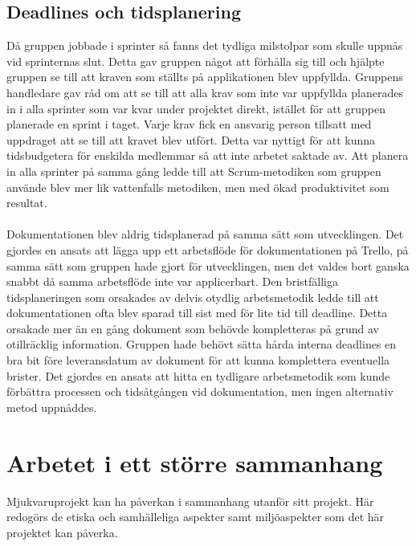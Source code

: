 \subsection{Deadlines och tidsplanering}
Då gruppen jobbade i sprinter så fanns det tydliga milstolpar som skulle uppnås vid sprinternas slut. Detta gav gruppen något att förhålla sig till och hjälpte gruppen se till att kraven som ställts på applikationen blev uppfyllda. Gruppens handledare gav råd om att se till att alla krav som inte var uppfyllda planerades in i alla sprinter som var kvar under projektet direkt, istället för att gruppen planerade en sprint i taget. Varje krav fick en ansvarig person tillsatt med uppdraget att se till att kravet blev utfört. Detta var nyttigt för att kunna tidsbudgetera för enskilda medlemmar så att inte arbetet saktade av. Att planera in alla sprinter på samma gång ledde till att Scrum-metodiken som gruppen använde blev mer lik vattenfalls metodiken, men med ökad produktivitet som resultat.
\\ \\
Dokumentationen blev aldrig tidsplanerad på samma sätt som utvecklingen. Det gjordes en ansats att lägga upp ett arbetsflöde för dokumentationen på Trello, på samma sätt som gruppen hade gjort för utvecklingen, men det valdes bort ganska snabbt då samma arbetsflöde inte var applicerbart. 
Den bristfälliga tidsplaneringen som orsakades av delvis otydlig arbetsmetodik ledde till att dokumentationen ofta blev sparad till sist med för lite tid till deadline. Detta orsakade mer än en gång dokument som behövde kompletteras på grund av otillräcklig information. Gruppen hade behövt sätta hårda interna deadlines en bra bit före leveransdatum av dokument för att kunna komplettera eventuella brister. Det gjordes en ansats att hitta en tydligare arbetsmetodik som kunde förbättra processen och tidsåtgången vid dokumentation, men ingen alternativ metod uppnåddes.

\section{Arbetet i ett större sammanhang}
\label{sec:work-wider-context}
Mjukvaruprojekt kan ha påverkan i sammanhang utanför sitt projekt. Här redogörs de etiska och samhälleliga aspekter samt miljöaspekter som det här projektet kan påverka.

